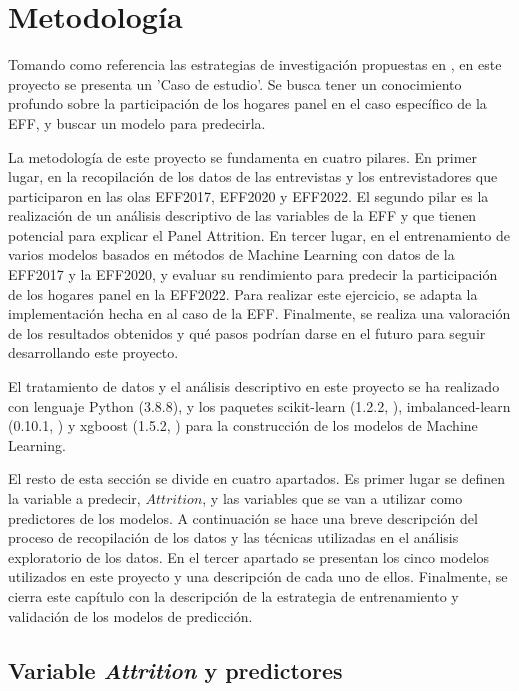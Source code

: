 \chapter{Metodología}
\label{chapter:metodologia}

Tomando como referencia las estrategias de investigación propuestas en \cite{oates2022researching}, en este proyecto se presenta un 'Caso de estudio'. Se busca tener un conocimiento profundo sobre la participación de los hogares panel en el caso específico de la EFF, y buscar un modelo para predecirla.

La metodología de este proyecto se fundamenta en cuatro pilares. En primer lugar, en la recopilación de los datos de las entrevistas y los entrevistadores que participaron en las olas EFF2017, EFF2020 y EFF2022. El segundo pilar es la realización de un análisis descriptivo de las variables de la EFF y que tienen potencial para explicar el Panel Attrition. En tercer lugar, en el entrenamiento de varios modelos basados en métodos de Machine Learning con datos de la EFF2017 y la EFF2020, y evaluar su rendimiento para predecir la participación de los hogares panel en la EFF2022. Para realizar este ejercicio, se adapta la implementación hecha en \cite{beste2023case} al caso de la EFF. Finalmente, se realiza una valoración de los resultados obtenidos y qué pasos podrían darse en el futuro para seguir desarrollando este proyecto.

El tratamiento de datos y el análisis descriptivo en este proyecto se ha realizado con lenguaje Python (3.8.8), y los paquetes scikit-learn (1.2.2, \cite{pedregosa2011scikit}), imbalanced-learn (0.10.1, \cite{lemaavztre2017imbalanced}) y xgboost (1.5.2, \cite{chen2016xgboost}) para la construcción de los modelos de Machine Learning.

El resto de esta sección se divide en cuatro apartados. Es primer lugar se definen la variable a predecir, $Attrition$, y las variables que se van a utilizar como predictores de los modelos. A continuación se hace una breve descripción del proceso de recopilación de los datos y las técnicas utilizadas en el análisis exploratorio de los datos. En el tercer apartado se presentan los cinco modelos utilizados en este proyecto y una descripción de cada uno de ellos. Finalmente, se cierra este capítulo con la descripción de la estrategia de entrenamiento y validación de los modelos de predicción.

\section{Variable \textit{Attrition} y predictores}
\label{section:attrition_predictors}

